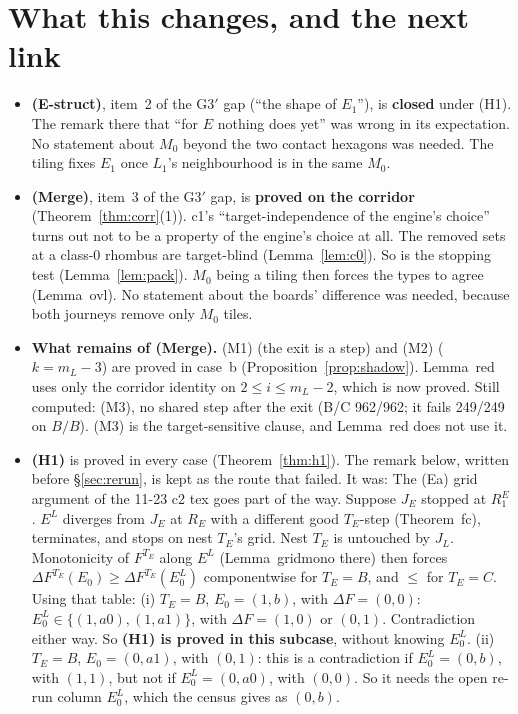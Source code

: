 \documentclass[11pt]{article}
\theoremstyle{definition}\newtheorem{definition}[theorem]{Definition}\newtheorem{remark}[theorem]{Remark}
\begin{document}
\section{What this changes, and the next link}\label{sec:next}
\begin{itemize}
\item \textbf{(E-struct)}, item~2 of the G3$'$ gap (``the shape of $E_1$''), is \textbf{closed} under (H1). The remark there that ``for $E$ nothing does yet'' was wrong in its expectation. No statement about $M_0$ beyond the two contact hexagons was needed. The tiling fixes $E_1$ once $L_1$'s neighbourhood is in the same $M_0$.
\item \textbf{(Merge)}, item~3 of the G3$'$ gap, is \textbf{proved on the corridor} (Theorem~\ref{thm:corr}(1)). c1's ``target-independence of the engine's choice'' turns out not to be a property of the engine's choice at all. The removed sets at a class-0 rhombus are target-blind (Lemma~\ref{lem:c0}). So is the stopping test (Lemma~\ref{lem:pack}). $M_0$ being a tiling then forces the types to agree (Lemma~ovl). No statement about the boards' difference was needed, because both journeys remove only $M_0$ tiles.
\item \textbf{What remains of (Merge).} (M1) (the exit is a step) and (M2) ($k=m_L-3$) are proved in case~b (Proposition~\ref{prop:shadow}). Lemma~red uses only the corridor identity on $2\le i\le m_L-2$, which is now proved. Still computed: (M3), no shared step after the exit (B/C 962/962; it fails 249/249 on $B/B$). (M3) is the target-sensitive clause, and Lemma~red does not use it.
\item \textbf{(H1)} is proved in every case (Theorem~\ref{thm:h1}). The remark below, written before \S\ref{sec:rerun}, is kept as the route that failed. It was: The (Ea) grid argument of the 11-23 c2 tex goes part of the way. Suppose $J_E$ stopped at $R^E_1$. $E^L$ diverges from $J_E$ at $R_E$ with a different good $T_E$-step (Theorem~fc), terminates, and stops on nest $T_E$'s grid. Nest $T_E$ is untouched by $J_L$. Monotonicity of $F^{T_E}$ along $E^L$ (Lemma~gridmono there) then forces $\Delta F^{T_E}(E_0)\ge\Delta F^{T_E}(E^L_0)$ componentwise for $T_E=B$, and $\le$ for $T_E=C$. Using that table:
(i) $T_E=B$, $E_0=(1,b)$, with $\Delta F=(0,0)$: $E^L_0\in\{(1,a0),(1,a1)\}$, with $\Delta F=(1,0)$ or $(0,1)$. Contradiction either way. So \textbf{(H1) is proved in this subcase}, without knowing $E^L_0$.
(ii) $T_E=B$, $E_0=(0,a1)$, with $(0,1)$: this is a contradiction if $E^L_0=(0,b)$, with $(1,1)$, but not if $E^L_0=(0,a0)$, with $(0,0)$. So it needs the open re-run column $E^L_0$, which the census gives as $(0,b)$.

\end{itemize}
\end{document}
